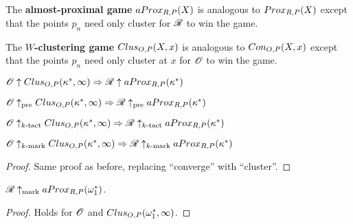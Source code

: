 \begin{definition}
  The \textbf{almost-proximal game} $aProx_{R,P}(X)$ is analogous to $Prox_{R,P}(X)$ except that the points $p_n$ need only cluster for $\mathscr{R}$ to win the game.
\end{definition}

\begin{definition}
  The \textbf{$W$-clustering game} $Clus_{O,P}(X,x)$ is analogous to $Con_{O,P}(X,x)$ except that the points $p_n$ need only cluster at $x$ for $\mathscr{O}$ to win the game.
\end{definition}

\begin{proposition}
$\mathscr{O}\uparrow Clus_{O,P}(\kappa^*,\infty) \Rightarrow \mathscr{R} \uparrow aProx_{R,P}(\kappa^*)$

$\mathscr{O}\uparrow_{\text{pre}} Clus_{O,P}(\kappa^*,\infty) \Rightarrow \mathscr{R} \uparrow_{\text{pre}} aProx_{R,P}(\kappa^*)$

$\mathscr{O}\uparrow_{k\text{-tact}} Clus_{O,P}(\kappa^*,\infty) \Rightarrow \mathscr{R} \uparrow_{k\text{-tact}} aProx_{R,P}(\kappa^*)$

$\mathscr{O}\uparrow_{k\text{-mark}} Clus_{O,P}(\kappa^*,\infty) \Rightarrow \mathscr{R} \uparrow_{k\text{-mark}} aProx_{R,P}(\kappa^*)$
\end{proposition}

\begin{proof}
  Same proof as before, replacing ``converge'' with ``cluster''.
\end{proof}

\begin{corollary}
$\mathscr{R}\uparrow_{\text{mark}} aProx_{R,P}(\omega_1^*)$.
\end{corollary}

\begin{proof}
Holds for $\mathscr{O}$ and $Clus_{O,P}(\omega_1^*,\infty)$.
\end{proof}

